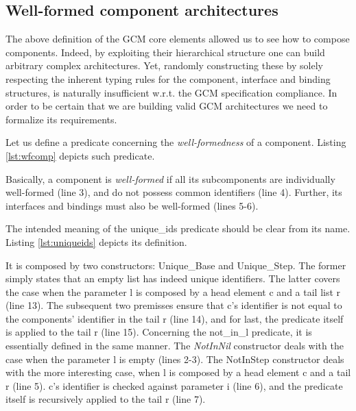\subsection{Well-formed component architectures}
\label{sub:wellformed}

	 The above definition of the \ac{GCM} core elements allowed us to see how to compose components.
	 Indeed, by exploiting their hierarchical structure one can build arbitrary complex
	 architectures. Yet, randomly constructing these by solely respecting the 
	 inherent typing rules for the \textsf{component}, \textsf{interface}
	 and \textsf{binding} structures, is naturally insufficient w.r.t.
	 the \ac{GCM} specification compliance. In order to be certain that we are
	 building valid \ac{GCM} architectures we need to formalize its requirements.
	
	
		Let us define a predicate concerning the \textit{well-formedness} of a \textsf{component}.
	Listing \ref{lst:wfcomp} depicts such predicate. %
	
	
		

	\noindent Basically, a \textsf{component} is \textit{well-formed} if all its subcomponents
	are individually well-formed (line 3), and do not possess common identifiers (line 4). Further,
	its interfaces and bindings must also be well-formed (lines 5-6). 

	
	The intended meaning of the
	\textsf{unique\_ids} predicate should be clear from its name. 
	Listing \ref{lst:uniqueids} depicts its definition.
	
	

	\noindent It is composed by two constructors: \textsf{Unique\_Base} and \textsf{Unique\_Step}.
	The former simply states that an empty list has indeed unique identifiers. The latter covers
	the case when the parameter \textsf{l} is composed by a head element
	\textsf{c} and a tail list \textsf{r} (line 13). The subsequent two premisses
	ensure that \textsf{c}'s identifier is not equal to the \textsf{component}s' identifier 
	in the tail \textsf{r} (line 14), and for last, the predicate itself is applied to the tail
	\textsf{r} (line 15). Concerning the \textsf{not\_in\_l} predicate, it is essentially	
	defined in the same manner. The \textsl{NotInNil} constructor deals with the case
	when the parameter \textsf{l} is empty (lines 2-3). The \textsf{NotInStep} constructor deals with the
	more interesting case, when \textsf{l} is composed by a head element \textsf{c} 
	and a tail \textsf{r} (line 5).	\textsf{c}'s identifier is checked against
	parameter \textsf{i} (line 6), and the predicate itself is recursively applied
	to the tail \textsf{r} (line 7).
	
